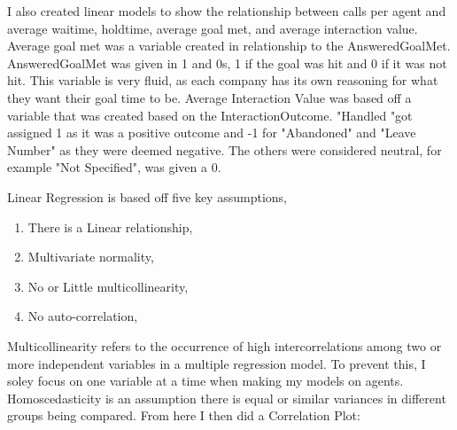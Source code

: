 \documentclass[12pt]{article}
\begin{document}
I also created linear models to show the relationship between calls per agent and average waitime, holdtime, average goal met, and average 
interaction value. Average goal met was a variable created in relationship to the AnsweredGoalMet. AnsweredGoalMet was given in 1 and 0s, 
1 if the goal was hit and 0 if it was not hit. This variable is very fluid, as each company has its own reasoning for what they want their
goal time to be. Average Interaction Value was based off a variable that was created based on the InteractionOutcome. "Handled "got assigned 
1 as it was a positive outcome and -1 for "Abandoned" and "Leave Number" as they were deemed negative. The others were considered neutral, for example
"Not Specified", was given a 0. 

  Linear Regression is based off five key assumptions,
  \begin{enumerate}
  \item There is a Linear relationship,
  \item Multivariate normality,
  \item No or Little multicollinearity,
  \item No auto-correlation,
\end{enumerate} Multicollinearity refers to the occurrence of high intercorrelations among two or more independent variables in a multiple regression model.
To prevent this, I soley focus on one variable at a time when making my models on agents. Homoscedasticity is an assumption there is equal or similar variances in different groups being compared.
From here I then did a Correlation Plot:
\end{document}
